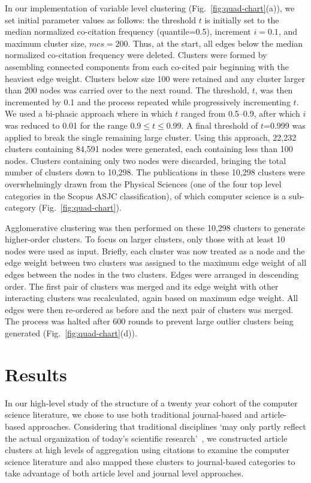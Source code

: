 In our implementation of variable level clustering (Fig.~\ref{fig:quad-chart}(a)), 
we set initial parameter values as follows: the threshold  $t$  is initially set to  the median normalized co-citation frequency (quantile=0.5), increment $i = 0.1$, and maximum cluster size, $mcs=200$. Thus, at the start, all edges below the median normalized co-citation frequency were deleted. Clusters were formed by assembling connected components from each co-cited pair beginning with the heaviest edge weight. Clusters below size 100 were retained and any cluster larger than 200 nodes was carried over to the next round. The threshold, $t$, was then incremented by 0.1 and the process repeated while progressively incrementing $t$.  We used a bi-phasic approach where in which $t$ ranged from 0.5--0.9, after which $i$ was reduced to 0.01 for the range $0.9 \leq t \leq 0.99$. A final threshold of $t$=0.999 was applied to break the single remaining large cluster.  Using this approach, 22,232 clusters containing 84,591 nodes were generated, each containing less than 100 nodes. Clusters containing only two nodes were discarded, bringing the total number of clusters down to 10,298. The publications in these 10,298 clusters were overwhelmingly drawn from the Physical Sciences (one of the four top level categories in the Scopus ASJC classification), of which computer science is a sub-category (Fig.~\ref{fig:quad-chart}).

Agglomerative clustering was then performed on these 10,298 clusters to generate higher-order clusters. To focus on larger clusters, only those with at least 10 nodes were used as input. Briefly, each cluster was now treated as a node and the edge weight between two clusters was assigned to the maximum edge weight of all edges between the nodes in the two clusters. Edges were arranged in descending order. The first pair of clusters was merged and its edge weight with other interacting clusters was recalculated, again based on maximum edge weight. All edges were then re-ordered as before and the next pair of clusters was merged. The process was halted after 600 rounds to prevent large outlier clusters being generated (Fig.~\ref{fig:quad-chart}(d)).

\section*{Results}
\label{sec:results}

 In our high-level study of the structure of a twenty year cohort of the computer science literature, we chose to use both traditional journal-based and article-based approaches. Considering that traditional disciplines `may only partly reflect the actual organization of today's scientific research'~\cite{waltman_new_2012}, we constructed article clusters at high levels of aggregation using citations to examine the  computer science literature and also mapped these clusters to journal-based categories to take advantage of both article level and journal level approaches.

